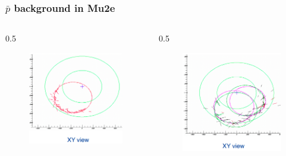 \documentclass{beamer}
\begin{document}
\begin{frame}
    \frametitle{$\bar{p}$ background in Mu2e}
    \vspace{-4mm}
    \begin{columns}
        \begin{column}{0.5\framewidth}
            \begin{figure}[!h]
                \centering
                \includegraphics[width =0.6\columnwidth]{figures/png/Screenshot_20240926_115031.png}
               \end{figure}
        \end{column}
        \begin{column}{0.5\framewidth}
            \begin{figure}[!h]
                \centering
                \includegraphics[width =0.6\columnwidth]{figures/png/Screenshot_20240926_115050.png}
               \end{figure}
        \end{column}
    \end{columns}
\vspace{-3mm}

\end{frame}
\end{document}
